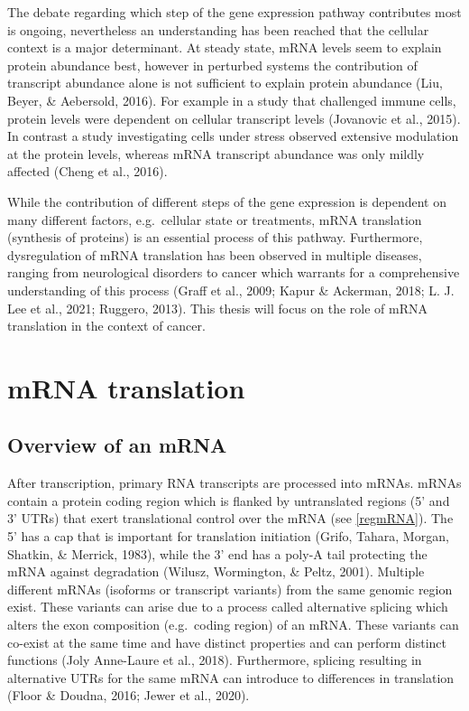 \documentclass[
  12pt,
  openany]{book}
\begin{document}
The debate regarding which step of the gene expression pathway contributes most is ongoing, nevertheless an understanding has been reached that the cellular context is a major determinant. At steady state, mRNA levels seem to explain protein abundance best, however in perturbed systems the contribution of transcript abundance alone is not sufficient to explain protein abundance (Liu, Beyer, \& Aebersold, 2016). For example in a study that challenged immune cells, protein levels were dependent on cellular transcript levels (Jovanovic et al., 2015). In contrast a study investigating cells under stress observed extensive modulation at the protein levels, whereas mRNA transcript abundance was only mildly affected (Cheng et al., 2016).

While the contribution of different steps of the gene expression is dependent on many different factors, e.g.~cellular state or treatments, mRNA translation (synthesis of proteins) is an essential process of this pathway. Furthermore, dysregulation of mRNA translation has been observed in multiple diseases, ranging from neurological disorders to cancer which warrants for a comprehensive understanding of this process (Graff et al., 2009; Kapur \& Ackerman, 2018; L. J. Lee et al., 2021; Ruggero, 2013). This thesis will focus on the role of mRNA translation in the context of cancer.
\newline

\section{mRNA translation}
\subsection{Overview of an mRNA}

After transcription, primary RNA transcripts are processed into mRNAs. mRNAs contain a protein coding region which is flanked by untranslated regions (5' and 3' UTRs) that exert translational control over the mRNA (see \ref{regmRNA}). The 5' has a cap that is important for translation initiation (Grifo, Tahara, Morgan, Shatkin, \& Merrick, 1983), while the 3' end has a poly-A tail protecting the mRNA against degradation (Wilusz, Wormington, \& Peltz, 2001). Multiple different mRNAs (isoforms or transcript variants) from the same genomic region exist. These variants can arise due to a process called alternative splicing which alters the exon composition (e.g.~coding region) of an mRNA. These variants can co-exist at the same time and have distinct properties and can perform distinct functions (Joly Anne-Laure et al., 2018). Furthermore, splicing resulting in alternative UTRs for the same mRNA can introduce to differences in translation (Floor \& Doudna, 2016; Jewer et al., 2020).
\end{document}

